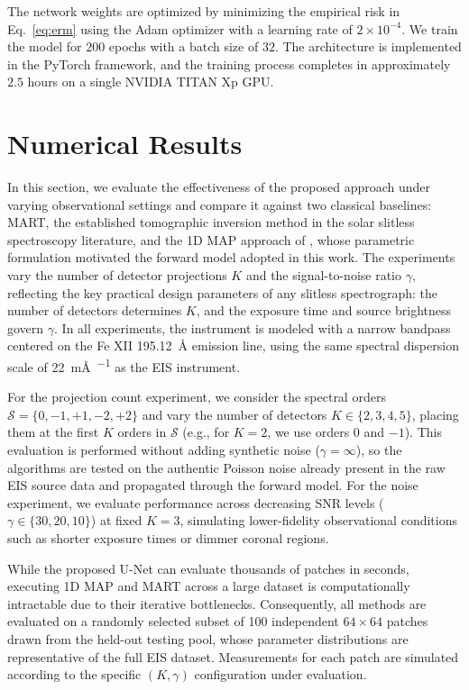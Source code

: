 \documentclass[linenumbers,twocolumn]{aastex7}
\begin{document}
The network weights are optimized by minimizing the empirical risk in
Eq.~\eqref{eq:erm} using the Adam optimizer \citep{kingma2014adam} with a learning
rate of $2 \times 10^{-4}$. We train the model for $200$ epochs with a batch
size of $32$. The architecture is implemented in the PyTorch framework, and the
training process completes in approximately $2.5$ hours on a single NVIDIA TITAN
Xp GPU.

\section{Numerical Results} \label{sec:num_res}
In this section, we evaluate the effectiveness of the proposed approach under
varying observational settings and compare it against two classical baselines:
MART, the established tomographic inversion method in the solar slitless
spectroscopy literature, and the 1D MAP approach of
\citet{davila2019slitless}, whose parametric formulation motivated the forward
model adopted in this work. The experiments vary the number of detector
projections $K$ and the signal-to-noise ratio $\gamma$, reflecting the key
practical design parameters of any slitless spectrograph: the number of
detectors determines $K$, and the exposure time and source brightness govern
$\gamma$. In all experiments, the instrument is modeled with a narrow bandpass
centered on the Fe XII \SI{195.12}{\angstrom} emission line, using the same
spectral dispersion scale of \SI{22}{\milli\angstrom\per\pixel} as the EIS
instrument.

For the projection count experiment, we consider the spectral orders
$\mathcal{S} = \{0, -1, +1, -2, +2\}$ and vary the number of detectors $K \in
\{2, 3, 4, 5\}$, placing them at the first $K$ orders in $\mathcal{S}$ (e.g.,
for $K = 2$, we use orders $0$ and $-1$). This evaluation is performed without
adding synthetic noise ($\gamma = \infty$), so the algorithms are tested on the
authentic Poisson noise already present in the raw EIS source data and
propagated through the forward model. For the noise experiment, we evaluate
performance across decreasing SNR levels ($\gamma \in \{30, 20, 10\}$) at
fixed $K = 3$, simulating lower-fidelity observational conditions such as
shorter exposure times or dimmer coronal regions.

While the proposed U-Net can evaluate thousands of patches in seconds, executing
1D MAP and MART across a large dataset is computationally intractable due to
their iterative bottlenecks. Consequently, all methods are evaluated on a
randomly selected subset of 100 independent $64 \times 64$ patches drawn from
the held-out testing pool, whose parameter distributions are representative of
the full EIS dataset. Measurements for each patch are simulated according to
the specific $(K, \gamma)$ configuration under evaluation.
\end{document}
